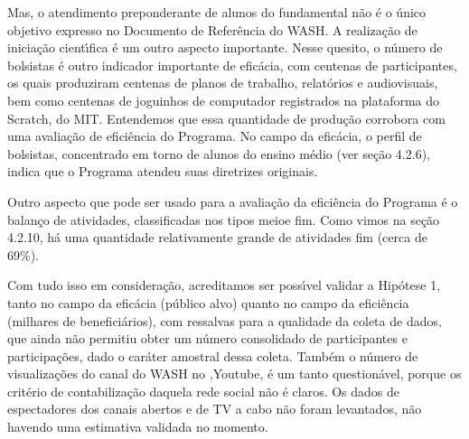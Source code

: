 \documentclass[
12pt,		%
openright,	%
twoside,  %
a4paper,			%
chapter=TITLE,		%
english,			%
french,				%
spanish,			%
brazil				%
]{USPSC-classe/USPSC}
\begin{document}
Mas, o atendimento preponderante de alunos do fundamental n\~ao \'e o \'unico objetivo expresso no Documento de Refer\^encia do WASH. A realiza\c{c}\~ao de inicia\c{c}\~ao cient\'{\i}fica \'e um outro aspecto importante. Nesse quesito, o n\'umero de bolsistas \'e outro indicador importante de efic\'acia, com centenas de participantes, os quais produziram centenas de planos de trabalho, relat\'orios e audiovisuais, bem como centenas de joguinhos de computador registrados na plataforma do Scratch, do MIT. Entendemos que essa quantidade de produ\c{c}\~ao corrobora com uma avalia\c{c}\~ao de efici\^encia do Programa. No campo da efic\'acia, o perfil de bolsistas, concentrado em torno de alunos do ensino m\'edio (ver se\c{c}\~ao 4.2.6), indica que o Programa atendeu suas diretrizes originais.

















Outro aspecto que pode ser usado para a avalia\c{c}\~ao da efici\^encia do Programa \'e o balan\c{c}o de atividades, classificadas nos tipos \textquotedbl meio\textquotedbl  e \textquotedbl fim\textquotedbl . Como vimos na se\c{c}\~ao 4.2.10, h\'a uma quantidade relativamente grande de atividades fim (cerca de 69\%).

















Com tudo isso em considera\c{c}\~ao, acreditamos ser poss\'{\i}vel validar a Hip\'otese 1, tanto no campo da efic\'acia (p\'ublico alvo) quanto no campo da efici\^encia (milhares de benefici\'arios), com ressalvas para a qualidade da coleta de dados, que ainda n\~ao permitiu obter um n\'umero consolidado de participantes e participa\c{c}\~oes, dado o car\'ater amostral dessa coleta. Tamb\'em o n\'umero de visualiza\c{c}\~oes do canal do WASH no ,Youtube, \'e um tanto question\'avel, porque os crit\'erio de contabiliza\c{c}\~ao daquela rede social n\~ao \'e claros. Os dados de espectadores dos canais abertos e de TV a cabo n\~ao foram levantados, n\~ao havendo uma estimativa validada no momento.
\end{document}
